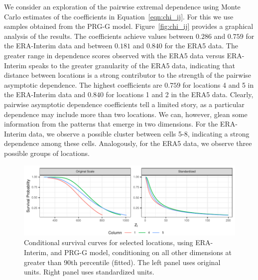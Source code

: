 We consider an exploration of the pairwise extremal dependence using Monte Carlo estimates of the 
  coefficients in  Equation~\eqref{eqn:chi_ij}. For this we use samples obtained from the PRG-G model.
  Figure~\ref{fig:chi_ij} provides a graphical analysis of the results. 
  The coefficients achieve values between $0.286$ and $0.759$ for the ERA-Interim data and 
  between $0.181$ and $0.840$ for the ERA5 data.  The greater range in dependence scores observed 
  with the ERA5 data versus ERA-Interim speaks to the greater granularity of the ERA5 data,
  indicating that distance between locations is a strong contributor to the strength of the 
  pairwise asymptotic dependence. The highest coefficients are $0.759$ for 
  locations 4 and 5 in the ERA-Interim data and
  $0.840$ for locations 1 and 2 in the ERA5 data.  Clearly, pairwise asymptotic
  dependence coefficients tell a limited story, as a particular dependence may include
  more than two locations.   We can, however, glean some information from the patterns that
  emerge in two dimensions.  For the ERA-Interim data, we observe a possible cluster 
  between cells 5-8, indicating a strong dependence among these cells.  Analogously, for
  the ERA5 data, we observe three possible groups of locations.

\begin{figure}[t]
    \centering
    \includegraphics[width=\linewidth]{./images/condsurv_1d}
    \caption{Conditional survival curves for selected locations, using ERA-Interim, and PRG-G model,  conditioning on all other dimensions at greater than 90th percentile (fitted)\label{fig:condsurv1d}. The left panel uses original units. Right panel uses standardized units.}
\end{figure}

